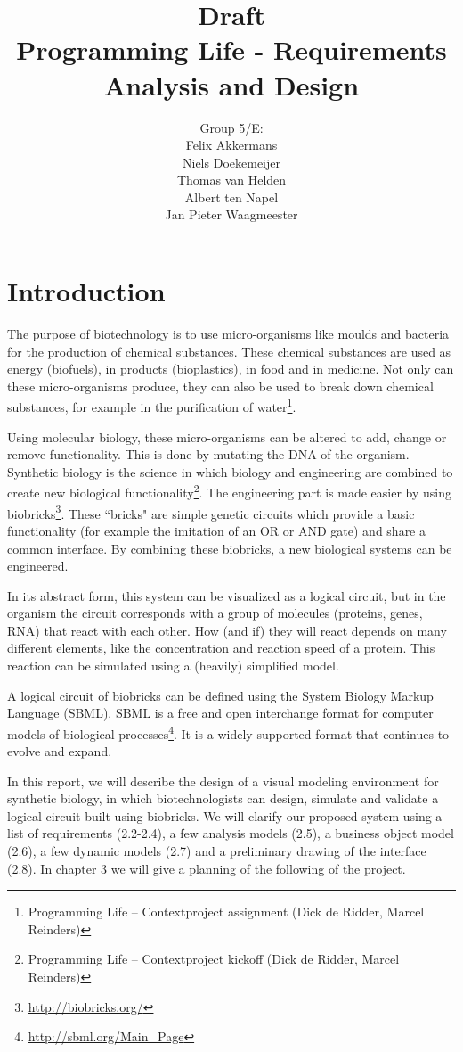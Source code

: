 \documentclass[a4paper]{article}
\title{{\sc Draft} \\Programming Life - Requirements Analysis and Design }
\author{Group 5/E:\\
Felix Akkermans \\
Niels Doekemeijer \\
Thomas van Helden \\
Albert ten Napel \\
Jan Pieter Waagmeester}
\begin{document}
\maketitle

\vfill

\small{\tableofcontents}
\pagebreak
\section{Introduction} 		%
The purpose of biotechnology is to use micro-organisms like moulds and bacteria for the production of chemical substances. These chemical substances are used as energy (biofuels), in products (bioplastics), in food and in medicine. Not only can these micro-organisms produce, they can also be used to break down chemical substances, for example in the purification of water\footnote{Programming Life – Contextproject assignment (Dick de Ridder, Marcel Reinders)}.

Using molecular biology, these micro-organisms can be altered to add, change or remove functionality. This is done by mutating the DNA of the organism. Synthetic biology is the science in which biology and engineering are combined to create new biological functionality\footnote{Programming Life – Contextproject kickoff (Dick de Ridder, Marcel Reinders)}. The engineering part is made easier by using biobricks\footnote{\url{http://biobricks.org/}}. These ``bricks" are simple genetic circuits which provide a basic functionality (for example the imitation of an OR or AND gate) and share a common interface. By combining these biobricks, a new biological systems can be engineered.

In its abstract form, this system can be visualized as a logical circuit, but in the organism the circuit corresponds with a group of molecules (proteins, genes, RNA) that react with each other. How (and if) they will react depends on many different elements, like the concentration and reaction speed of a protein. This reaction can be simulated using a (heavily) simplified model\footnotemark[1].

A logical circuit of biobricks can be defined using the System Biology Markup Language (SBML). SBML is a free and open interchange format for computer models of biological processes\footnote{\url{http://sbml.org/Main_Page}}. It is a widely supported format that continues to evolve and expand.

In this report, we will describe the design of a visual modeling environment for synthetic biology, in which biotechnologists can design, simulate and validate a logical circuit built using biobricks. We will clarify our proposed system using a list of requirements (2.2-2.4), a few analysis models (2.5), a business object model (2.6), a few dynamic models (2.7) and a preliminary drawing of the interface (2.8). In chapter 3 we will give a planning of the following of the project.
\end{document}
